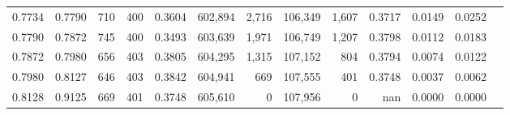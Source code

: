 \begin{tabular}{rrrrrrrrrrrrr}
0.7734 & 0.7790 &    710 & 400 &                                     0.3604 & 602,894 &   2,716 & 106,349 &   1,607 & 0.3717 & 0.0149 & 0.0252 \\
0.7790 & 0.7872 &    745 & 400 &                                     0.3493 & 603,639 &   1,971 & 106,749 &   1,207 & 0.3798 & 0.0112 & 0.0183 \\
0.7872 & 0.7980 &    656 & 403 &                                     0.3805 & 604,295 &   1,315 & 107,152 &     804 & 0.3794 & 0.0074 & 0.0122 \\
0.7980 & 0.8127 &    646 & 403 &                                     0.3842 & 604,941 &     669 & 107,555 &     401 & 0.3748 & 0.0037 & 0.0062 \\
0.8128 & 0.9125 &    669 & 401 &                                     0.3748 & 605,610 &       0 & 107,956 &       0 &    nan & 0.0000 & 0.0000 \\
\bottomrule
\end{tabular}
